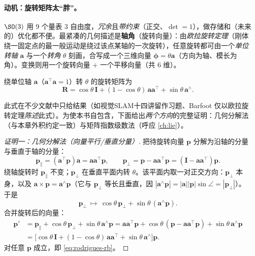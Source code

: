 \paragraph{动机：旋转矩阵太“胖”。}$\SO(3)$ 用 $9$ 个量表 $3$ 自由度，\emph{冗余}且\emph{带约束}（正交、$\det=1$），做存储和（未来的）优化都不便\cite{gaoxiang2019slam14}。最紧凑的几何描述是\textbf{轴角}（旋转向量）：由\emph{欧拉旋转定理}（刚体绕一固定点的最一般运动是绕过该点某轴的一次旋转\cite{barfoot2024state}），任意旋转都可由一个\emph{单位转轴} $\mathbf{a}$ 与一个\emph{转角} $\theta$ 刻画，合写成一个三维向量 $\boldsymbol{\phi}=\theta\mathbf{a}$（方向为轴、模长为角）。变换则用一个旋转向量 $+$ 一个平移向量（共 $6$ 维）。

\begin{theorem}\label{thm:rodrigues-rb}
绕单位轴 $\mathbf{a}$（$\mathbf{a}^\top\mathbf{a}=1$）转 $\theta$ 的旋转矩阵为
\begin{equation}
  \mathbf{R}=\cos\theta\,\mathbf{I}+(1-\cos\theta)\,\mathbf{a}\mathbf{a}^\top+\sin\theta\,\mathbf{a}^\wedge.
  \label{eq:rodrigues-rb}
\end{equation}
\end{theorem}
\noindent 此式在不少文献中只给结果（如视觉SLAM十四讲留作习题\cite{gaoxiang2019slam14}、Barfoot 仅以欧拉旋转定理\emph{陈述}此式\cite{barfoot2024state}）。为使本书自包含，下面给出\emph{两个方向}的完整证明：几何分解法（与本章外积约定一致）与矩阵指数级数法（呼应 \cref{ch:lie}）。

\begin{proof}[证明一：几何分解法（向量平行/垂直分量）]
把待旋转向量 $\mathbf{p}$ 分解为沿轴的分量与垂直于轴的分量：
\[
  \mathbf{p}_\parallel=(\mathbf{a}^\top\mathbf{p})\mathbf{a}=\mathbf{a}\mathbf{a}^\top\mathbf{p},\qquad
  \mathbf{p}_\perp=\mathbf{p}-\mathbf{a}\mathbf{a}^\top\mathbf{p}=(\mathbf{I}-\mathbf{a}\mathbf{a}^\top)\mathbf{p}.
\]
绕轴旋转时 $\mathbf{p}_\parallel$ 不变；$\mathbf{p}_\perp$ 在垂直平面内转 $\theta$。该平面内取一对正交方向：$\mathbf{p}_\perp$ 本身，以及 $\mathbf{a}\times\mathbf{p}=\mathbf{a}^\wedge\mathbf{p}$（它与 $\mathbf{p}_\perp$ 等长且垂直，因 $|\mathbf{a}^\wedge\mathbf{p}|=|\mathbf{a}||\mathbf{p}|\sin\angle=|\mathbf{p}_\perp|$）。于是
\[
  \mathbf{p}_\perp\ \longmapsto\ \cos\theta\,\mathbf{p}_\perp+\sin\theta\,(\mathbf{a}^\wedge\mathbf{p}).
\]
合并旋转后的向量：
\begin{align*}
  \mathbf{p}'&=\mathbf{p}_\parallel+\cos\theta\,\mathbf{p}_\perp+\sin\theta\,\mathbf{a}^\wedge\mathbf{p}
   =\mathbf{a}\mathbf{a}^\top\mathbf{p}+\cos\theta\,(\mathbf{p}-\mathbf{a}\mathbf{a}^\top\mathbf{p})+\sin\theta\,\mathbf{a}^\wedge\mathbf{p}\\
  &=\big[\cos\theta\,\mathbf{I}+(1-\cos\theta)\,\mathbf{a}\mathbf{a}^\top+\sin\theta\,\mathbf{a}^\wedge\big]\mathbf{p}.
\end{align*}
对任意 $\mathbf{p}$ 成立，即 \cref{eq:rodrigues-rb}。
\end{proof}

